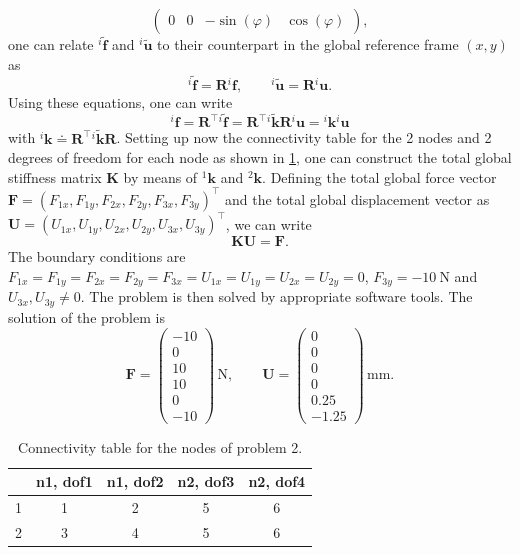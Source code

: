 \documentclass[a4paper,11pt]{article}
\numberwithin{equation}{section}
\newcommand\matr[1]{\ensuremath{\boldsymbol{\mathbf{#1}}}}
\newcommand\vect[1]{\ensuremath{\bm{#1}}}
\begin{document}
{\begin{equation}
\begin{pmatrix}
		0 & 0 & -\sin(\varphi) & \cos(\varphi) 
	\end{pmatrix},
\end{equation} one can relate ${}^i\tilde{\vect{f}}$ and ${}^i\tilde{\vect{u}}$ to their counterpart in the global reference frame $(x,y)$ as \begin{equation}
	{}^i\tilde{\vect{f}} = \matr{R} {}^i\vect{f}, \qquad {}^i\tilde{\vect{u}} = \matr{R} {}^i\vect{u}.
\end{equation} Using these equations, one can write \begin{equation}
	{}^i\vect{f} = \matr{R}^\top {}^i\tilde{\vect{f}} = \matr{R}^\top {}^i\tilde{\matr{k}} \matr{R}{}^i\vect{u} = {}^i\matr{k}{}^i\vect{u}
\end{equation} with ${}^i\matr{k} \doteq \matr{R}^\top {}^i\tilde{\matr{k}} \matr{R}$. Setting up now the connectivity table for the 2 nodes and 2 degrees of freedom for each node as shown in \cref{tab:problem_2}, one can construct the total global stiffness matrix $\matr{K}$ by means of ${}^1\matr{k}$ and ${}^2\matr{k}$. Defining the total global force vector $\vect{F} = (F_{1x}, F_{1y}, F_{2x}, F_{2y}, F_{3x}, F_{3y})^\top$ and the total global displacement vector as $\vect{U} = (U_{1x}, U_{1y}, U_{2x}, U_{2y}, U_{3x}, U_{3y})^\top$, we can write \begin{equation}
	\matr{K}\vect{U} = \vect{F}.
\end{equation} The boundary conditions are $F_{1x} = F_{1y} = F_{2x} = F_{2y} = F_{3x} = U_{1x} = U_{1y} = U_{2x} = U_{2y} = 0$, $F_{3y} = -\SI{10}{\newton}$ and $U_{3x}, U_{3y} \neq 0$. The problem is then solved by appropriate software tools. The solution of the problem is \begin{equation}
	\vect{F} = \begin{pmatrix}
		-10 \\
		0 \\
		10 \\
		10 \\
		0 \\
		-10
	\end{pmatrix} \,\si{\newton}, \qquad \vect{U} = \begin{pmatrix}
		0 \\
		0 \\
		0 \\
		0 \\
		0.25 \\
		-1.25
	\end{pmatrix}\,\si{\milli\meter}.
\end{equation}

\begin{table}
	\centering
	\begin{tabular}{|c|c|c|c|c|}
		\hline
		\text{Element} & n1, dof1 & n1, dof2 & n2, dof3 & n2, dof4 \\
		\hline\hline
		1 & 1 & 2 & 5 & 6 \\
		2 & 3 & 4 & 5 & 6 \\
		\hline
	\end{tabular}
	\caption{Connectivity table for the nodes of problem 2.}
	\label{tab:problem_2}
\end{table}	
}
\end{document}
